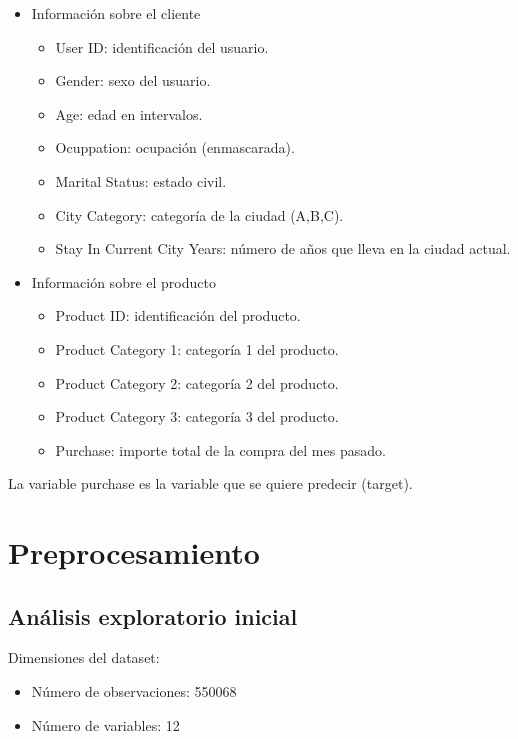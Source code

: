 \documentclass[12pt]{article}
\begin{document}
\begin{itemize}
    \item Información sobre el cliente
    \begin{itemize}
        \item User ID: identificación del usuario.
        \item Gender: sexo del usuario.
        \item Age: edad en intervalos.
        \item Ocuppation: ocupación (enmascarada).
        \item Marital Status: estado civil.
        \item City Category: categoría de la ciudad (A,B,C).
        \item Stay In Current City Years: número de años que lleva en la ciudad actual.
    \end{itemize}
    \item Información sobre el producto
        \begin{itemize}
            \item Product ID: identificación del producto.
            \item Product Category 1: categoría 1 del producto.
            \item Product Category 2: categoría 2 del producto.
            \item Product Category 3: categoría 3 del producto.
            \item Purchase: importe total de la compra del mes pasado.
        \end{itemize}
\end{itemize}


La variable purchase es la variable que se quiere predecir (target).

\section{Preprocesamiento}

\subsection{Análisis exploratorio inicial}

Dimensiones del dataset:
\begin{itemize}
    \item Número de observaciones: 550068
    \item Número de variables: 12
\end{itemize}
\end{document}
